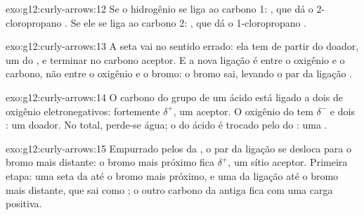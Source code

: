 \begin{solution}{exo:g12:curly-arrows:12}
Se o hidrogênio se liga ao carbono 1: , que dá o
2-cloropropano . Se ele se liga ao carbono 2:
, que dá o 1-cloropropano .
\end{solution}

\begin{solution}{exo:g12:curly-arrows:13}
A seta vai no sentido errado: ela tem de partir do doador, um  do , e terminar no carbono aceptor. E a nova ligação é
entre o oxigênio e o carbono, não entre o oxigênio e o bromo: o bromo
sai, levando o par da ligação .
\end{solution}

\begin{solution}{exo:g12:curly-arrows:14}
O carbono do grupo  de um ácido está ligado a dois  de
oxigênio eletronegativos: fortemente $\delta^+$, um aceptor. O oxigênio
do  tem $\delta^-$ e dois : um doador. No total,
perde-se água; o  do ácido é trocado pelo  do :
uma .
\end{solution}

\begin{solution}{exo:g12:curly-arrows:15}
Empurrado pelos  da , o par da ligação 
se desloca para o bromo mais distante: o bromo mais próximo fica
$\delta^+$, um sítio aceptor. Primeira etapa: uma seta da 
até o bromo mais próximo, e uma da ligação  até o bromo mais
distante, que sai como ; o outro carbono da antiga 
fica com uma carga positiva.
\end{solution}

